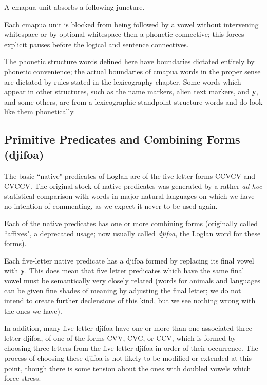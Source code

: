 \documentclass[12pt]{book}
\begin{document}
A cmapua unit absorbs a following juncture.

Each cmapua unit is blocked from being followed by a vowel without intervening whitespace or by optional whitespace then a phonetic connective;  this forces explicit pauses before the logical and sentence connectives.

The phonetic structure words defined here have boundaries dictated entirely by phonetic convenience;  the actual boundaries of cmapua words in the proper sense are dictated by rules stated in the lexicography chapter.  Some words which appear in other structures, such as the name markers, alien text markers, and {\bf y}, and some others, are from a lexicographic standpoint structure words and do look like them phonetically.

\subsection{Primitive Predicates and Combining Forms (djifoa)}

The basic ``native" predicates of Loglan are of the five letter forms CCVCV and CVCCV.  The original stock of native predicates was generated by a rather {\em ad hoc\/} statistical comparison with words in major natural languages on which we have no intention of commenting, as we expect it never to be used again. 

Each of the native predicates has one or more combining forms (originally called ``affixes", a  deprecated usage;  now usually called {\em djifoa\/}, the Loglan word for these forms).

Each five-letter native predicate has a djifoa formed by replacing its final vowel with {\bf y}.  This does mean that five letter predicates which have the same final vowel must be semantically very closely related (words for animals and languages can be given fine shades of meaning by adjusting the final letter;  we do not intend to create further declensions of this kind, but we see nothing wrong with the ones we have).

In addition, many five-letter djifoa have one or more than one associated three letter djifoa, of one of the forms CVV, CVC, or CCV, which is formed by choosing three letters from 
the five letter djifoa in order of their occurrence.  The process of choosing these djifoa is not likely to be modified or extended at this point, though there is some tension about the ones with doubled vowels which force stress.
\end{document}
